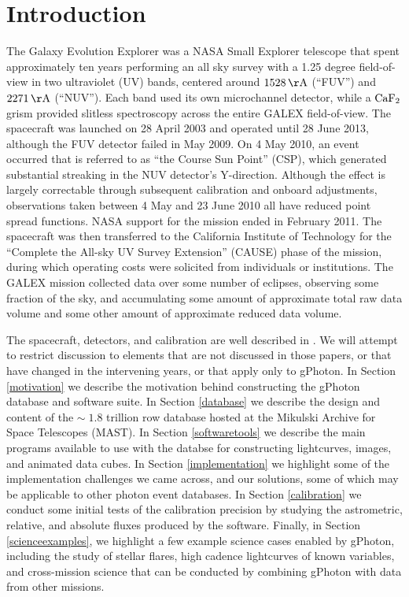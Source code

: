 \documentclass[preprint]{aastex}
\begin{document}
\section{Introduction}
The Galaxy Evolution Explorer \citep[GALEX;][]{mar2005} was a NASA Small Explorer telescope that spent approximately ten years performing an all sky survey with a 1.25 degree field-of-view in two ultraviolet (UV) bands, centered around $1528\,\rm{\AA}$ (“FUV”) and $2271\,\rm{\AA}$ (“NUV”). Each band used its own microchannel detector, while a $\rm{CaF_{2}}$ grism provided slitless spectroscopy across the entire GALEX field-of-view. The spacecraft was launched on 28 April 2003 and operated until 28 June 2013, although the FUV detector failed in May 2009. On 4 May 2010, an event occurred that is referred to as ``the Course Sun Point'' (CSP), which generated substantial streaking in the NUV detector's Y-direction. Although the effect is largely correctable through subsequent calibration and onboard adjustments, observations taken between 4 May and 23 June 2010 all have reduced point spread functions. NASA support for the mission ended in February 2011. The spacecraft was then transferred to the California Institute of Technology for the “Complete the All-sky UV Survey Extension” (CAUSE) phase of the mission, during which operating costs were solicited from individuals or institutions. The GALEX mission collected data over {\color{red}some number of eclipses}, observing {\color{red}some fraction of the sky}, and accumulating {\color{red}some amount of} approximate total raw data volume and {\color{red}some other amount of} approximate reduced data volume.

The spacecraft, detectors, and calibration are well described in \citet{mor2005,mor2007}. We will attempt to restrict discussion to elements that are not discussed in those papers, or that have changed in the intervening years, or that apply only to gPhoton.  In Section \ref{motivation} we describe the motivation behind constructing the gPhoton database and software suite.  In Section \ref{database} we describe the design and content of the $\sim\;1.8$ trillion row database hosted at the Mikulski Archive for Space Telescopes (MAST).  In Section \ref{softwaretools} we describe the main programs available to use with the databse for constructing lightcurves, images, and animated data cubes.  In Section \ref{implementation} we highlight some of the implementation challenges we came across, and our solutions, some of which may be applicable to other photon event databases.  In Section \ref{calibration} we conduct some initial tests of the calibration precision by studying the astrometric, relative, and absolute fluxes produced by the software.  Finally, in Section \ref{scienceexamples}, we highlight a few example science cases enabled by gPhoton, including the study of stellar flares, high cadence lightcurves of known variables, and cross-mission science that can be conducted by combining gPhoton with data from other missions.
\end{document}
